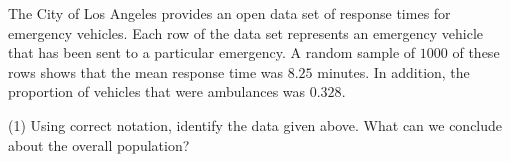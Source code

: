 \documentclass[../mathNotesPreamble]{subfiles}
\begin{document}
  \begin{ex*}
    The City of Los Angeles provides an open data set of response times for emergency vehicles. Each row of the data set represents an emergency vehicle that has been sent to a particular emergency. A random sample of $1000$ of these rows shows that the mean response time was $8.25$ minutes. In addition, the proportion of vehicles that were ambulances was $0.328$.
  \end{ex*}
  \begin{extasks}[after-item-skip=\stretch{1}](1)
    \task Using correct notation, identify the data given above.
    \task What can we conclude about the overall population?
  \end{extasks}
  \pagebreak
  
  

  \pagebreak
\end{document}
